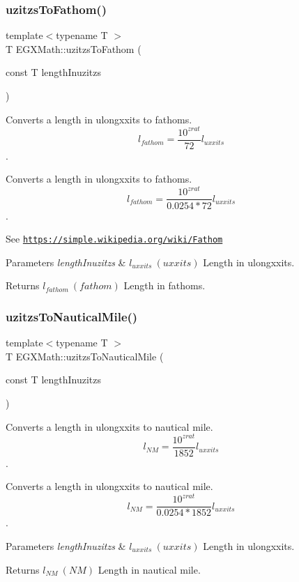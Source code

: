 \subsubsection{\texorpdfstring{uzitzs\+To\+Fathom()}{uzitzsToFathom()}}
{\footnotesize\ttfamily template$<$typename T $>$ \\
T E\+G\+X\+Math\+::uzitzs\+To\+Fathom (\begin{DoxyParamCaption}\item[{const T}]{length\+Inuzitzs }\end{DoxyParamCaption})}



Converts a length in ulongxxits to fathoms. \[ l_{fathom}= \frac{10^{zrat}}{72} l_{uxxits} \]. 

Converts a length in ulongxxits to fathoms. \[ l_{fathom}= \frac{10^{zrat}}{0.0254 * 72} l_{uxxits} \].

See \href{https://simple.wikipedia.org/wiki/Fathom}{\tt https\+://simple.\+wikipedia.\+org/wiki/\+Fathom} 
\begin{DoxyParams}{Parameters}
{\em length\+Inuzitzs} & $ l_{uxxits}\ (uxxits)$ Length in ulongxxits. \\
\hline
\end{DoxyParams}
\begin{DoxyReturn}{Returns}
$ l_{fathom}\ (fathom)$ Length in fathoms. 
\end{DoxyReturn}
\mbox{\label{group___e_g_x_math-_conversions-_length_conversions-_imperial-uzitzs-_nautical_ga71c06fc85e22f77eba0b234edefa4562}} 
\subsubsection{\texorpdfstring{uzitzs\+To\+Nautical\+Mile()}{uzitzsToNauticalMile()}}
{\footnotesize\ttfamily template$<$typename T $>$ \\
T E\+G\+X\+Math\+::uzitzs\+To\+Nautical\+Mile (\begin{DoxyParamCaption}\item[{const T}]{length\+Inuzitzs }\end{DoxyParamCaption})}



Converts a length in ulongxxits to nautical mile. \[ l_{NM}= \frac{10^{zrat}}{1852} l_{uxxits} \]. 

Converts a length in ulongxxits to nautical mile. \[ l_{NM}= \frac{10^{zrat}}{0.0254 * 1852} l_{uxxits} \].


\begin{DoxyParams}{Parameters}
{\em length\+Inuzitzs} & $ l_{uxxits}\ (uxxits)$ Length in ulongxxits. \\
\hline
\end{DoxyParams}
\begin{DoxyReturn}{Returns}
$ l_{NM}\ (NM)$ Length in nautical mile. 
\end{DoxyReturn}
